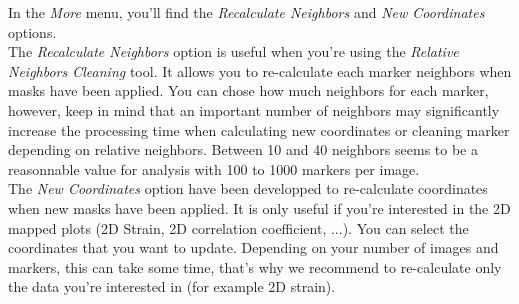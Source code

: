 \indent\indent In the \textit{More} menu, you'll find the \textit{Recalculate Neighbors} and \textit{New Coordinates} options.\\
\newline
The \textit{Recalculate Neighbors} option is useful when you're using the \textit{Relative Neighbors Cleaning} tool. It allows you to re-calculate each marker neighbors when masks have been applied. You can chose how much neighbors for each marker, however, keep in mind that an important number of neighbors may significantly increase the processing time when calculating new coordinates or cleaning marker depending on relative neighbors. Between 10 and 40 neighbors seems to be a reasonnable value for analysis with 100 to 1000 markers per image.\\
\newline
The \textit{New Coordinates} option have been developped to re-calculate coordinates when new masks have been applied. It is only useful if you're interested in the 2D mapped plots (2D Strain, 2D correlation coefficient, ...). You can select the coordinates that you want to update. Depending on your number of images and markers, this can take some time, that's why we recommend to re-calculate only the data you're interested in (for example 2D strain).\\

